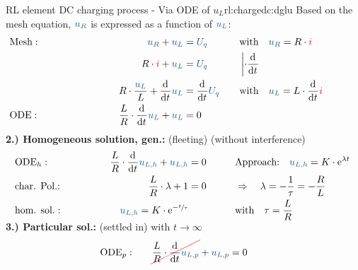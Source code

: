 {\begin{expl}{RL element DC charging process - Via ODE of $u_L$}{rl:chargedc:dglu}
    Based on the mesh equation, $\ecv{u_R}$ is expressed as a function of $\ecv{u_L}$:%
    \begingroup%
        \addtolength{\jot}{2pt}%
    \begin{align*}
        &\text{Mesh}:&&&
            \ecv{u_R} + \ecv{u_L}  &= \ecv{U_q}&&&
            &\text{with}\quad \ecv{u_R} = R \cdot \eci{i} \\
        &&&&
            R \cdot \eci{i} + \ecv{u_L} &= \ecv{U_q} &&&
            &\left| \cdot \dt \right. \\
        &&&&
        R \cdot \frac{\ecv{u_L}}{L}  + \dt \ecv{u_L}  &= \dt \ecv{U_q} &&&
            &\text{with}\quad \ecv{u_L} = L \cdot \dt \eci{i} \\
        &\text{ODE}:&&&
            \frac{L}{R} \cdot \dt \ecv{u_L} + \ecv{u_L}  &= 0
            \\[-15pt]&\hphantom{R1ooooooo}&&&\hphantom{L3oooooooooooooooooooo}&\hphantom{R3ooo}&&&&\hphantom{R5oooooooooooooooooooooo}\nonumber%
        \end{align*}%
    \textbf{2.) Homogeneous solution, gen.:} (fleeting) (without interference)%
    \begin{align*}%
        &\text{ODE}_{h}:&&&
            \frac{L}{R} \cdot \dt \ecv{u_{L,h}} + \ecv{u_{L,h}} &= 0 &&&
                &\text{Approach:}\quad
                \ecv{u_{L,h}} = K \cdot \mathrm{e}^{\lambda t}\\
        &\text{char. Pol.:}&&&
            \frac{L}{R} \cdot \lambda + 1 &= 0 &&&
                &\Rightarrow\quad \lambda = -\frac{1}{\tau} = -\frac{R}{L}\\
        &\text{hom. sol.}:&&&
            \ecv{u_{L,h}} = K \cdot \mathrm{e}^{-\sfrac{t}{\tau}}&&&&
                &\text{with}\quad \tau = \frac{L}{R}
    \\[-15pt]&\hphantom{R1ooooooo}&&&\hphantom{L3oooooooooooooooooooo}&\hphantom{R3ooo}&&&&\hphantom{R5oooooooooooooooooooooo}\nonumber%
    \end{align*}%
    \textbf{3.) Particular sol.:} (settled in) with $t \to \infty$%
    \begin{align*}%
        &\text{ODE}_{p}:&&&
            \redcancel{\frac{L}{R} \cdot \dt \ecv{u_{L,p}}} + \ecv{u_{L,p}} &= 0 &&&

\end{align*}
\end{expl}}
